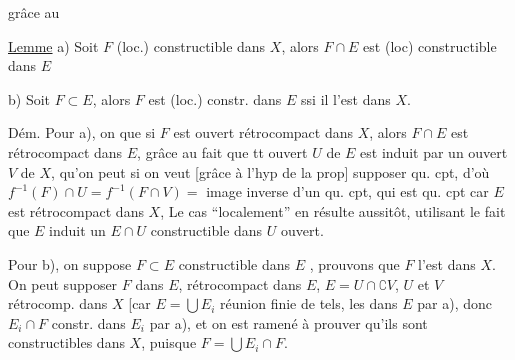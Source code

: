 grâce au

\uline{Lemme} \quad a) Soit  $F$ (loc.) constructible dans $X$,  alors $F\cap E$ est (loc) constructible dans $E$

b) Soit  $F\subset E$,  alors $F$ est (loc.) constr. dans $E$ ssi il l'est dans $X$.

Dém. Pour a), on  que si $F$ est ouvert rétrocompact dans $X$, alors $F\cap E$ est rétrocompact dans $E$, grâce au fait que tt ouvert  $U$ de $E$ est
induit par un ouvert $V$ de $X$, qu'on peut si on veut [grâce à l'hyp  de la prop] supposer qu. cpt, d'où $f^{-1}(F)\cap U=f^{-1}(F\cap V)=$ image inverse d'un qu. cpt, qui est qu. cpt car $E$ est rétrocompact dans $X$,   Le cas ``localement''
en résulte aussitôt, utilisant le fait que $E$ induit un $E\cap U$ constructible dans  $U$ ouvert.

Pour b), on suppose $F\subset E$ constructible dans \uline{$E$} , prouvons que $F$ l'est dans $X$. On peut supposer $F$    dans $E$, rétrocompact dans $E$,   $E=U\cap \complement V$, $U$ et $V$ rétrocomp.  dans $X$ 
[car $E=\bigcup E_i$ réunion finie de tels, les  dans \uline{$E$} par a), donc $E_i\cap F$ constr. dans $E_i$ par a), et on est ramené à prouver qu'ils sont constructibles dans $X$, puisque $F=\bigcup E_i\cap F$.
 
